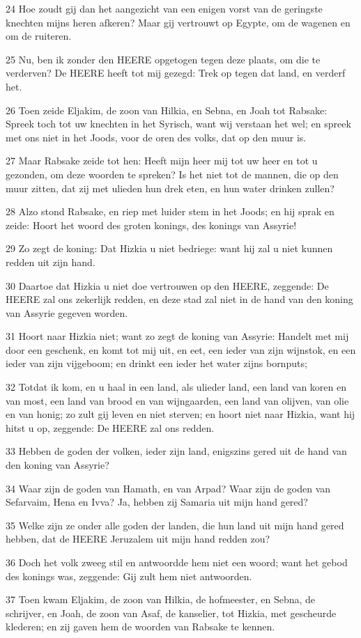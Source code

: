 \par 24 Hoe zoudt gij dan het aangezicht van een enigen vorst van de geringste knechten mijns heren afkeren? Maar gij vertrouwt op Egypte, om de wagenen en om de ruiteren.
\par 25 Nu, ben ik zonder den HEERE opgetogen tegen deze plaats, om die te verderven? De HEERE heeft tot mij gezegd: Trek op tegen dat land, en verderf het.
\par 26 Toen zeide Eljakim, de zoon van Hilkia, en Sebna, en Joah tot Rabsake: Spreek toch tot uw knechten in het Syrisch, want wij verstaan het wel; en spreek met ons niet in het Joods, voor de oren des volks, dat op den muur is.
\par 27 Maar Rabsake zeide tot hen: Heeft mijn heer mij tot uw heer en tot u gezonden, om deze woorden te spreken? Is het niet tot de mannen, die op den muur zitten, dat zij met ulieden hun drek eten, en hun water drinken zullen?
\par 28 Alzo stond Rabsake, en riep met luider stem in het Joods; en hij sprak en zeide: Hoort het woord des groten konings, des konings van Assyrie!
\par 29 Zo zegt de koning: Dat Hizkia u niet bedriege: want hij zal u niet kunnen redden uit zijn hand.
\par 30 Daartoe dat Hizkia u niet doe vertrouwen op den HEERE, zeggende: De HEERE zal ons zekerlijk redden, en deze stad zal niet in de hand van den koning van Assyrie gegeven worden.
\par 31 Hoort naar Hizkia niet; want zo zegt de koning van Assyrie: Handelt met mij door een geschenk, en komt tot mij uit, en eet, een ieder van zijn wijnstok, en een ieder van zijn vijgeboom; en drinkt een ieder het water zijns bornputs;
\par 32 Totdat ik kom, en u haal in een land, als ulieder land, een land van koren en van most, een land van brood en van wijngaarden, een land van olijven, van olie en van honig; zo zult gij leven en niet sterven; en hoort niet naar Hizkia, want hij hitst u op, zeggende: De HEERE zal ons redden.
\par 33 Hebben de goden der volken, ieder zijn land, enigszins gered uit de hand van den koning van Assyrie?
\par 34 Waar zijn de goden van Hamath, en van Arpad? Waar zijn de goden van Sefarvaim, Hena en Ivva? Ja, hebben zij Samaria uit mijn hand gered?
\par 35 Welke zijn ze onder alle goden der landen, die hun land uit mijn hand gered hebben, dat de HEERE Jeruzalem uit mijn hand redden zou?
\par 36 Doch het volk zweeg stil en antwoordde hem niet een woord; want het gebod des konings was, zeggende: Gij zult hem niet antwoorden.
\par 37 Toen kwam Eljakim, de zoon van Hilkia, de hofmeester, en Sebna, de schrijver, en Joah, de zoon van Asaf, de kanselier, tot Hizkia, met gescheurde klederen; en zij gaven hem de woorden van Rabsake te kennen.

